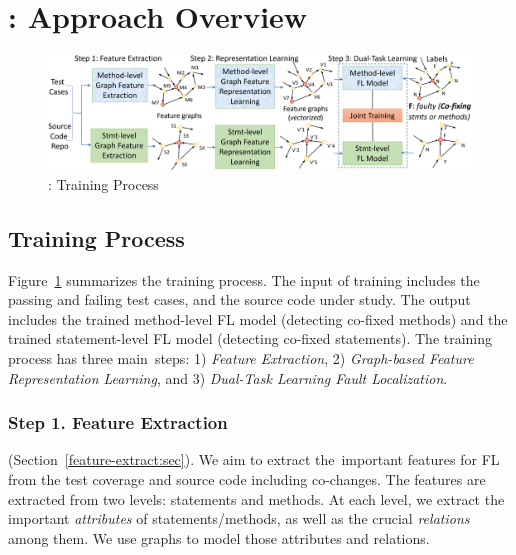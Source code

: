 \section{{\tool}: Approach Overview}
\label{overview:sec}

\begin{figure}[t]
	\centering
	\includegraphics[width=5.65in]{graphs/overview-training-4.png} %
        \vspace{-6pt}
	\caption{{\tool}: Training Process}
        \label{train-overview}
\end{figure}



\subsection{Training Process}


Figure~\ref{train-overview} summarizes the training process.
%
The input of training includes the passing and failing test cases, and
the source code under study.
The output includes the trained method-level FL model (detecting
co-fixed methods) and the trained statement-level FL model (detecting
co-fixed statements). The training process has three main~steps: 1)
{\em Feature Extraction}, 2) {\em Graph-based Feature Representation
  Learning}, and 3) {\em Dual-Task Learning Fault Localization}.



\subsubsection{{\bf Step 1. Feature Extraction}}

(Section~\ref{feature-extract:sec}). We aim to extract the~important
features for FL from the test coverage and source code including
co-changes. The features are extracted from two levels: statements and
methods. At each level, we extract the important {\em attributes} of
statements/methods, as well as the crucial {\em relations} among
them. We use graphs to model those attributes and relations.

